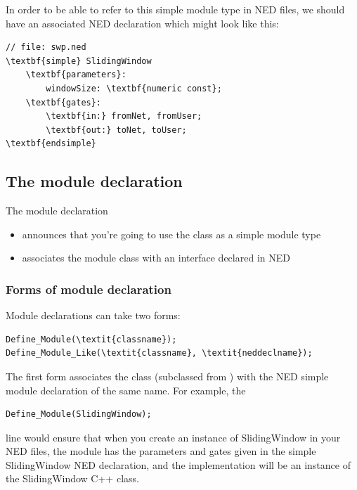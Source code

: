 In order to be able to refer to this simple module type in NED
files, we should have an associated NED declaration which might
look like this:


\begin{Verbatim}[commandchars=\\\{\}]
// file: swp.ned
\textbf{simple} SlidingWindow
    \textbf{parameters}:
        windowSize: \textbf{numeric const};
    \textbf{gates}:
        \textbf{in:} fromNet, fromUser;
        \textbf{out:} toNet, toUser;
\textbf{endsimple}
\end{Verbatim}




\subsection{The module declaration}

The module declaration
\begin{itemize}
\item{announces that you're going to use the class as a
    simple module type}
\item{associates the module class with an interface declared in NED}
\end{itemize}

\subsubsection{Forms of module declaration}


Module declarations can take two forms:

\begin{Verbatim}[commandchars=\\\{\}]
Define_Module(\textit{classname});
Define_Module_Like(\textit{classname}, \textit{neddeclname});
\end{Verbatim}

The first form associates the class (subclassed from
) with the NED simple
module declaration of the same name. For example, the

\begin{verbatim}
Define_Module(SlidingWindow);
\end{verbatim}

line would ensure that when you create an instance of SlidingWindow in
your NED files, the module has the parameters and gates given in the
simple SlidingWindow NED declaration, and the implementation will be
an instance of the SlidingWindow C++ class.


